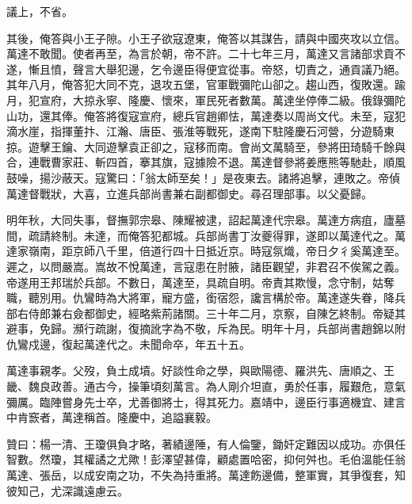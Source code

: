 \begin{pinyinscope}
議上，不省。

其後，俺答與小王子隙。小王子欲寇遼東，俺答以其謀告，請與中國夾攻以立信。萬達不敢聞。使者再至，為言於朝，帝不許。二十七年三月，萬達又言諸部求貢不遂，慚且憤，聲言大舉犯邊，乞令邊臣得便宜從事。帝怒，切責之，通貢議乃絕。其年八月，俺答犯大同不克，退攻五堡，官軍戰彌陀山卻之。趨山西，復敗還。踰月，犯宣府，大掠永寧、隆慶、懷來，軍民死者數萬。萬達坐停俸二級。俄錄彌陀山功，還其俸。俺答將復寇宣府，總兵官趙卿怯，萬達奏以周尚文代。未至，寇犯滴水崖，指揮董抃、江瀚、唐臣、張淮等戰死，遂南下駐隆慶石河營，分遊騎東掠。遊擊王鑰、大同遊擊袁正卻之，寇移而南。會尚文萬騎至，參將田琦騎千餘與合，連戰曹家莊、斬四首，搴其旗，寇據險不退。萬達督參將姜應熊等馳赴，順風鼓噪，揚沙蔽天。寇驚曰：「翁太師至矣！」是夜東去。諸將追擊，連敗之。帝偵萬達督戰狀，大喜，立進兵部尚書兼右副都御史。尋召理部事。以父憂歸。

明年秋，大同失事，督撫郭宗皋、陳耀被逮，詔起萬達代宗皋。萬達方病疽，廬墓間，疏請終制。未達，而俺答犯都城。兵部尚書丁汝夔得罪，遂即以萬達代之。萬達家嶺南，距京師八千里，倍道行四十日抵近京。時寇氛熾，帝日夕彳奚萬達至。遲之，以問嚴嵩。嵩故不悅萬達，言寇患在肘腋，諸臣觀望，非君召不俟駕之義。帝遂用王邦瑞於兵部。不數日，萬達至，具疏自明。帝責其欺慢，念守制，姑奪職，聽別用。仇鸞時為大將軍，寵方盛，銜宿怨，讒言構於帝。萬達遂失眷，降兵部右侍郎兼右僉都御史，經略紫荊諸關。三十年二月，京察，自陳乞終制。帝疑其避事，免歸。瀕行疏謝，復摘訛字為不敬，斥為民。明年十月，兵部尚書趙錦以附仇鸞戍邊，復起萬達代之。未聞命卒，年五十五。

萬達事親孝。父歿，負土成墳。好談性命之學，與歐陽德、羅洪先、唐順之、王畿、魏良政善。通古今，操筆頃刻萬言。為人剛介坦直，勇於任事，履艱危，意氣彌厲。臨陣嘗身先士卒，尤善御將士，得其死力。嘉靖中，邊臣行事適機宜、建言中肯窾者，萬達稱首。隆慶中，追謚襄毅。

贊曰：楊一清、王瓊俱負才略，著績邊陲，有人倫鑒，鋤奸定難因以成功。亦俱任智數。然瓊，其權譎之尤歟！彭澤望甚偉，顧處置哈密，抑何舛也。毛伯溫能任翁萬達、張岳，以成安南之功，不失為持重將。萬達飭邊備，整軍實，其爭復套，知彼知己，尤深識遠慮云。


\end{pinyinscope}